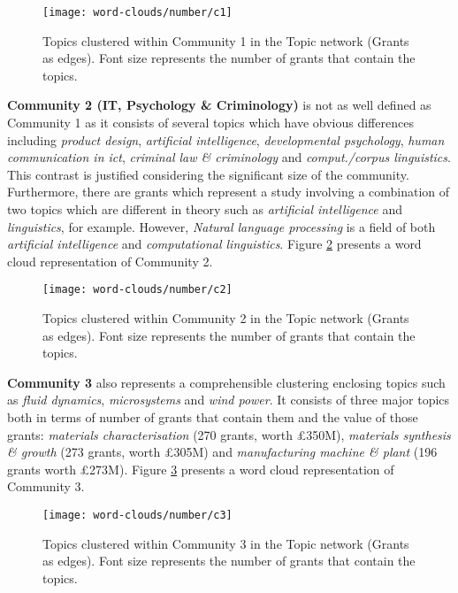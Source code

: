 {\begin{figure}[!htbp]
    \centering
    \texttt{[image: word-clouds/number/c1]}
    \caption[Topics clustered within Community 1 in the Topic network (Grants as edges)]{Topics clustered within Community 1 in the Topic network (Grants as edges). Font size represents the number of grants that contain the topics.}
    \label{fig:topic_a_number_c1}
\end{figure}

\noindent\textbf{Community 2 (IT, Psychology \& Criminology)} is not as well defined as Community 1 as it consists of several topics which have obvious differences including \textit{product design}, \textit{artificial intelligence}, \textit{developmental psychology}, \textit{human communication in ict}, \textit{criminal law \& criminology} and \textit{comput./corpus linguistics}. This contrast is justified considering the significant size of the community. Furthermore, there are grants which represent a study involving a combination of two topics which are different in theory such as \textit{artificial intelligence} and \textit{linguistics}, for example. However, \textit{Natural language processing} is a field of both \textit{artificial intelligence} and \textit{computational linguistics}. Figure \ref{fig:topic_a_number_c2} presents a word cloud representation of Community 2.

\begin{figure}[!htbp]
    \centering
    \texttt{[image: word-clouds/number/c2]}
    \caption[Topics clustered within Community 2 in the Topic network (Grants as edges)]{Topics clustered within Community 2 in the Topic network (Grants as edges). Font size represents the number of grants that contain the topics.}
    \label{fig:topic_a_number_c2}
\end{figure}

\noindent\textbf{Community 3} also represents a comprehensible clustering enclosing topics such as \textit{fluid dynamics}, \textit{microsystems} and \textit{wind power}. It consists of three major topics both in terms of number of grants that contain them and the value of those grants: \textit{materials characterisation} (270 grants, worth \pounds350M), \textit{materials synthesis \& growth} (273 grants, worth \pounds305M) and \textit{manufacturing machine \& plant} (196 grants worth \pounds273M). Figure \ref{fig:topic_a_number_c3} presents a word cloud representation of Community 3.

\begin{figure}[!htbp]
    \centering
    \texttt{[image: word-clouds/number/c3]}
    \caption[Topics clustered within Community 3 in the Topic network (Grants as edges)]{Topics clustered within Community 3 in the Topic network (Grants as edges). Font size represents the number of grants that contain the topics.}
    \label{fig:topic_a_number_c3}
\end{figure}

}
